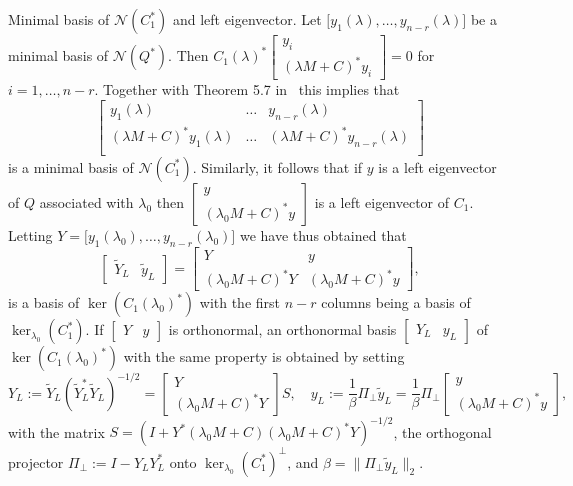 \documentclass[12pt]{article}
\begin{document}
\begin{paragraph}{Minimal basis of $\mathcal{N}(C_1^*)$ and left eigenvector.}
 Let $\big[ y_1(\lambda),\ldots,y_{n-r}(\lambda)\big]$ be a minimal basis of $\mathcal{N}(Q^*)$.
 Then 
 $
  C_1(\lambda)^* \begin{bmatrix}
                  y_i \\
                  (\lambda M + C)^* y_i
                 \end{bmatrix} = 0
 $
 for $i = 1,\ldots,n-r$. Together with Theorem 5.7 in~\cite{de2009linearizations} this implies that
\[
\begin{bmatrix}
 y_1(\lambda) & \ldots & y_{n-r}(\lambda) \\
 (\lambda M + C)^* y_1(\lambda) & \ldots & (\lambda M + C)^* y_{n-r}(\lambda) \\
\end{bmatrix}
\]
is a minimal basis of $\mathcal{N}(C_1^*)$.
Similarly, it follows that if $y$ is a left eigenvector of $Q$ associated with $\lambda_0$ then 
$\begin{bmatrix}
                  y \\
                  (\lambda_0 M + C)^* y
\end{bmatrix}$ is a left eigenvector of $C_1$.
Letting
$Y = \big[ y_1(\lambda_0),\ldots,y_{n-r}(\lambda_0)\big]$ we have thus obtained that 
\begin{equation} \label{eq:LeftC1}
 \begin{bmatrix}
   \tilde Y_L & \tilde y_L
   \end{bmatrix} = 
 \begin{bmatrix} Y & y \\
    (\lambda_0 M + C)^* Y  & (\lambda_0 M + C)^*y \end{bmatrix},
\end{equation}
is a basis of $\ker(C_1(\lambda_0)^*)$ with the first $n-r$ columns being a basis of $\ker_{\lambda_0}(C_1^*)$. If $\begin{bmatrix} Y  & y \end{bmatrix}$ is orthonormal, an orthonormal basis $\begin{bmatrix} Y_L  & y_L \end{bmatrix}$ of $\ker(C_1(\lambda_0)^*)$ with the same property is obtained by setting
\begin{equation}  \label{eq:LeftC1orth}
 Y_L:= \tilde Y_L (\tilde Y_L^* \tilde Y_L)^{-1/2} = \begin{bmatrix}
                                        Y \\
                                        (\lambda_0 M + C)^* Y
                                       \end{bmatrix} S, \quad 
y_L:= \frac{1}{\beta} \Pi_\perp\tilde y_L = \frac{1}{\beta} \Pi_\perp \begin{bmatrix}
y \\
(\lambda_0 M + C)^* y
\end{bmatrix},
\end{equation}
with 
the matrix $S = (I+Y^* (\lambda_0M+C) (\lambda_0M+C)^* Y )^{-1/2}$, the orthogonal projector $\Pi_\perp := I - Y_L Y_L^*$ onto $\ker_{\lambda_0}(C_1^*)^\perp$, and $\beta = \|\Pi_\perp\tilde y_L\|_2$.


\end{paragraph}
\end{document}
